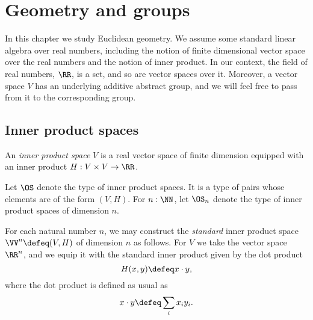 \chapter{Geometry and groups}
\label{ch:euclidean}


In this chapter we study Euclidean geometry.  We assume some standard linear
algebra over real numbers, including the notion of finite dimensional vector
space over the real numbers and the notion of inner product.  In our context,
the field of real numbers, $\RR$, is a set, and so are vector spaces over it.
Moreover, a vector space $V$ has an underlying additive abstract group, and we
will feel free to pass from it to the corresponding group.

\section{Inner product spaces}

\begin{definition}\label{def:InnerProductSpace}
  An {\em inner product space} $V$ is a real vector space of finite dimension
  equipped with an inner product $H : V \times V \to \RR $.
\end{definition}

Let $\OS$ denote the type of inner product spaces.  It is a type of pairs whose
elements are of the form $(V,H)$.
For $n : \NN$, let $\OS_n$ denote the type of inner product spaces of dimension $n$.

For each natural number $n$, we may construct the {\em standard} inner product
space $\VV^n \defeq (V,H)$ of dimension $n$ as follows.  For $V$ we take the
vector space $\RR^n$, and we equip it with the standard inner product given by
the dot product
$$ H ( x , y) \defeq x \cdot y, $$
where the dot product is defined as usual as
$$ x \cdot y \defeq \sum_i x_i y_i . $$

